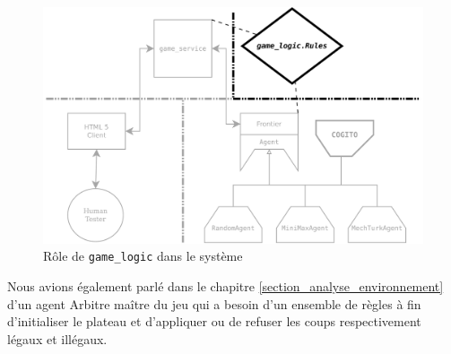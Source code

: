 \begin{figure}[H] 
\centering
\includegraphics[width=\textwidth]{files/william/archi_lib} 
\caption{Rôle de \texttt{\gls{game_logic}} dans le système} 
\end{figure}

Nous avions également parlé dans le chapitre \ref{section_analyse_environnement} d'un agent \og Arbitre \fg{} maître du jeu qui a besoin d'un ensemble de règles à fin d'initialiser le plateau et d'appliquer ou de refuser les coups respectivement légaux et illégaux.

